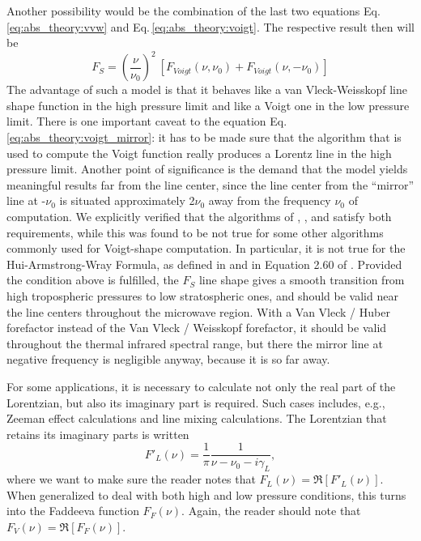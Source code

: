 Another possibility would be the combination of the last two equations
Eq.\,\ref{eq:abs_theory:vvw} and Eq.\,\ref{eq:abs_theory:voigt}. The respective result then will be 
\begin{equation}\label{eq:abs_theory:voigt_mirror}
 F_S=\left(\frac{\nu}{\nu_0}\right)^2~[F_{Voigt}(\nu,\nu_0)+F_{Voigt}(\nu,-\nu_0)]
\end{equation}
The advantage of such a model is that it behaves like a van
Vleck-Weisskopf line shape function in the high pressure limit and
like a Voigt one in the low pressure limit. There is one important
caveat to the equation Eq.\,\ref{eq:abs_theory:voigt_mirror}: it has to be made sure
that the algorithm that is used to compute the Voigt function really
produces a Lorentz line in the high pressure limit. Another point of
significance is the demand that the model yields meaningful results
far from the line center, since the line center from the ``mirror''
line at -$\nu_0$ is situated approximately 2$\nu_0$ away from the
frequency $\nu_0$ of computation. We explicitly verified that the
algorithms of \citet{Drayson:76}, \citet{Oliveiro:77}, and
\citet{kuntz:99} satisfy both requirements, while this was found to be
not true for some other algorithms commonly used for Voigt-shape
computation. In particular, it is not true for the Hui-Armstrong-Wray
Formula, as defined in \citet{hui:78} and in Equation 2.60 of
\citet{pwr:93}. Provided the condition above is fulfilled, the $F_S$
line shape gives a smooth transition from high tropospheric pressures
to low stratospheric ones, and should be valid near the line centers
throughout the microwave region. With a Van Vleck / Huber forefactor
instead of the Van Vleck / Weisskopf forefactor, it should be valid
throughout the thermal infrared spectral range, but there the mirror
line at negative frequency is negligible anyway, because it is so far
away.

For some applications, it is necessary to calculate not only the real
part of the Lorentzian, but also its imaginary part is required. Such
cases includes, e.g., Zeeman effect calculations and line mixing 
calculations.  The Lorentzian that retains its imaginary parts is written
\begin{equation}
  F'_L(\nu)=\frac{1}{\pi}\frac{1}{\nu-\nu_0-i\gamma_L},
\end{equation}
where we want to make sure the reader notes that $F_L(\nu)=\Re\left[F'_L(\nu)\right]$.
When generalized to deal with both high and low pressure conditions, 
this turns into the Faddeeva function $F_F(\nu)$.  Again, the reader
should note that $F_V(\nu)=\Re\left[F_F(\nu)\right]$.

